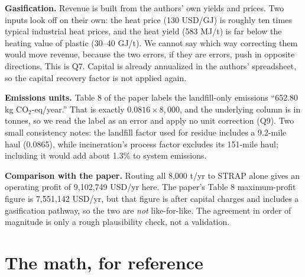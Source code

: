 \documentclass[11pt]{article}
\newcommand{\usd}{USD}
\begin{document}
\textbf{Gasification.} Revenue is built from the authors' own yields and prices.
Two inputs look off on their own: the heat price (130 \usd/GJ) is roughly ten
times typical industrial heat prices, and the heat yield (583 MJ/t) is far below
the heating value of plastic (30--40 GJ/t). We cannot say which way correcting
them would move revenue, because the two errors, if they are errors, push in
opposite directions. This is Q7. Capital is already annualized in the authors'
spreadsheet, so the capital recovery factor is not applied again.

\textbf{Emissions units.} Table 8 of the paper labels the landfill-only emissions
``652.80 kg CO$_2$-eq/year.'' That is exactly $0.0816\times 8{,}000$, and the
underlying column is in tonnes, so we read the label as an error and apply no
unit correction (Q9). Two small consistency notes: the landfill factor used for
residue includes a 9.2-mile haul (0.0865), while incineration's process factor
excludes its 151-mile haul; including it would add about 1.3\% to system
emissions.

\textbf{Comparison with the paper.} Routing all 8{,}000 t/yr to STRAP alone gives
an operating profit of 9{,}102{,}749 \usd/yr here. The paper's Table 8 maximum-profit
figure is 7{,}551{,}142 \usd/yr, but that figure is after capital charges and
includes a gasification pathway, so the two are \emph{not} like-for-like. The
agreement in order of magnitude is only a rough plausibility check, not a
validation.

\section{The math, for reference}
\end{document}
